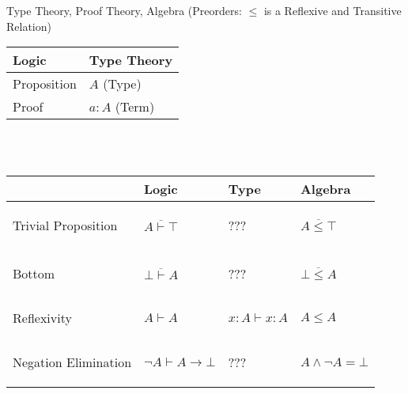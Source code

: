 Type Theory, Proof Theory, Algebra (Preorders: $\leq$ is a Reflexive
and Transitive Relation)
\\
\begin{tabular}{| l | l |}
\hline
\textbf{Logic} & \textbf{Type Theory} \\ \hline \hline
Proposition & $A$ (Type) \\ \hline
Proof & $a : A$ (Term) \\
\hline
\end{tabular}
\\
\cite{harper12}
\\
\begin{tabular}{| p{2cm} | p{3cm} | p{4.5cm} | p{3cm} |}
\hline
& \textbf{Logic} & \textbf{Type} & \textbf{Algebra}\\ \hline \hline
Trivial Proposition
  & \begin{center} $\overline{A \vdash \top}$ \end{center}
  & \begin{center} ??? \end{center}
  & \begin{center} $\overline{A \leq \top}$ \end{center} \\ \hline
Bottom
  & \begin{center} $\overline{\bot \vdash A}$ \end{center}
  & \begin{center} ??? \end{center}
  & \begin{center} $\overline{\bot \leq A}$ \end{center} \\ \hline
Reflexivity
  & \begin{center} $A \vdash A$ \end{center}
  & \begin{center} $x : A \vdash x : A$ \end{center}
  & \begin{center} $A \leq A$ \end{center} \\ \hline
Negation Elimination
  & \begin{center} $\neg A \vdash A \rightarrow \bot$ \end{center}
  & \begin{center} ??? \end{center}
  & \begin{center} $A \wedge \neg A = \bot$ \end{center} \\ \hline

\end{tabular}
